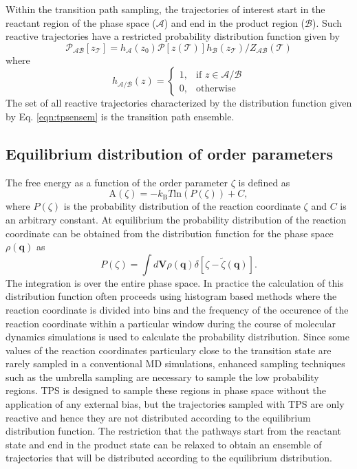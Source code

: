 \documentclass[journal=jpcbfk,manuscript=article,layout=traditional]{achemso}
\begin{document}
Within the transition path sampling, the trajectories of interest start in the reactant region of the 
phase space ($\mathcal{A}$) and end in the product region ($\mathcal{B}$). Such reactive trajectories have 
a restricted probability distribution function given by
\begin{equation}
\mathcal{P}_{\mathcal{AB}}[z_{\mathcal{T}}] = h_{\mathcal{A}}(z_0)\mathcal{P}[z(\mathcal{T})]
h_{\mathcal{B}}(z_{\mathcal{T}})/Z_{\mathcal{AB}}(\mathcal{T})\label{eqn:tpsensem}
\end{equation}
where 
\[
    h_{\mathcal{A}/\mathcal{B}}(z)= 
\begin{cases}
    1, & \text{if } z\in \mathcal{A}/\mathcal{B}\\
    0,              & \text{otherwise}
\end{cases}
\]
The set of all reactive trajectories characterized by the distribution function
given by Eq. \ref{eqn:tpsensem} is the transition path ensemble. 

\subsection{Equilibrium distribution of order parameters}
The free energy as a function of the order parameter $\zeta$ is defined
as 
\begin{equation}
\text{A}(\zeta) = -k_{\text{B}}T\text{ln}(P(\zeta)) + C, \label{eqn:fenergy}
\end{equation}
where $P(\zeta)$ is the probability distribution of the reaction coordinate
$\zeta$ and $C$ is an arbitrary constant. At equilibrium the probability distribution of the 
reaction coordinate 
can be obtained from the distribution function for the phase space $\rho(\textbf{q})$ as
\begin{equation}
P(\zeta) = \int d\textbf{V} \rho(\textbf{q})\delta\left[\zeta-\tilde{\zeta}(\textbf{q})\right].
\end{equation}
The integration is over the entire phase space. In practice the calculation of this distribution function
often proceeds using histogram based methods where the reaction coordinate is 
divided into bins and the frequency of the occurence of the reaction coordinate within a particular window
during the course of molecular dynamics simulations is used to calculate the probability distribution. 
Since some values of the reaction coordinates particulary close to the transition state are 
rarely sampled in a conventional MD simulations, enhanced sampling techniques such as the umbrella sampling
are necessary to sample the low probability regions. TPS is designed to sample these regions in phase space 
without the application of any external bias, but the trajectories sampled with TPS are only reactive and hence
they are not distributed according to the equilibrium distribution function. 
The restriction that the pathways start from the reactant state and end in the product state can be relaxed
to obtain an ensemble of trajectories that will be distributed according to the equilibrium distribution. 
\end{document}
